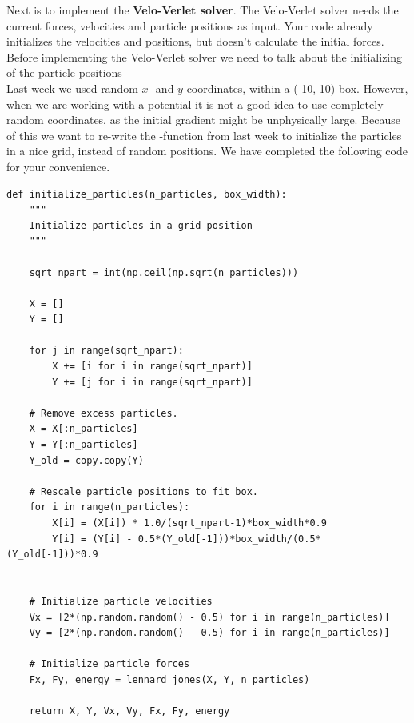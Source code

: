 \documentclass{article}
\begin{document}
\vspace{10pt}

Next is to implement the {\bf Velo-Verlet solver}.
The Velo-Verlet solver needs the current forces, velocities and particle positions as input.
Your code already initializes the velocities and positions, but doesn't calculate the initial forces. Before implementing the Velo-Verlet solver we need to talk about the initializing of the particle positions \\

Last week we used random $x$- and $y$-coordinates, within a (-10, 10) box.
However, when we are working with a potential it is not a good idea to use completely random coordinates, as the initial gradient might be unphysically large.
Because of this we want to re-write the -function from last week to initialize the particles in a nice grid, instead of random positions.
We have completed the following code for your convenience.

\begin{lstlisting}
def initialize_particles(n_particles, box_width):
    """
    Initialize particles in a grid position
    """

    sqrt_npart = int(np.ceil(np.sqrt(n_particles)))

    X = []
    Y = []

    for j in range(sqrt_npart):
        X += [i for i in range(sqrt_npart)]
        Y += [j for i in range(sqrt_npart)]

    # Remove excess particles.
    X = X[:n_particles]
    Y = Y[:n_particles]
    Y_old = copy.copy(Y)
    
    # Rescale particle positions to fit box.
    for i in range(n_particles):
        X[i] = (X[i]) * 1.0/(sqrt_npart-1)*box_width*0.9
        Y[i] = (Y[i] - 0.5*(Y_old[-1]))*box_width/(0.5*(Y_old[-1]))*0.9
    

    # Initialize particle velocities
    Vx = [2*(np.random.random() - 0.5) for i in range(n_particles)]
    Vy = [2*(np.random.random() - 0.5) for i in range(n_particles)]

    # Initialize particle forces
    Fx, Fy, energy = lennard_jones(X, Y, n_particles)

    return X, Y, Vx, Vy, Fx, Fy, energy

\end{lstlisting}
\end{document}
